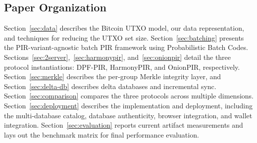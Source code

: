 \subsection{Paper Organization}

Section~\ref{sec:data} describes the Bitcoin UTXO model, our data representation, and techniques for reducing the UTXO set size. Section~\ref{sec:batching} presents the PIR-variant-agnostic batch PIR framework using Probabilistic Batch Codes. Sections~\ref{sec:2server},~\ref{sec:harmonypir}, and~\ref{sec:onionpir} detail the three protocol instantiations: DPF-PIR, HarmonyPIR, and OnionPIR, respectively. Section~\ref{sec:merkle} describes the per-group Merkle integrity layer, and Section~\ref{sec:delta-db} describes delta databases and incremental sync. Section~\ref{sec:comparison} compares the three protocols across multiple dimensions. Section~\ref{sec:deployment} describes the implementation and deployment, including the multi-database catalog, database authenticity, browser integration, and wallet integration. Section~\ref{sec:evaluation} reports current artifact measurements and lays out the benchmark matrix for final performance evaluation.
